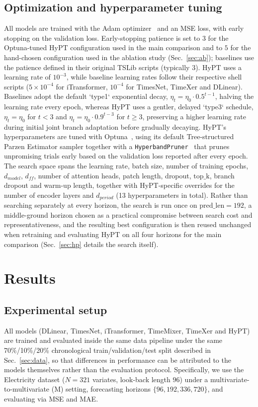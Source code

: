 \documentclass[10pt,journal]{IEEEtran}
\newcommand{\secref}[1]{Sec.~\ref{#1}}
\begin{document}
\subsection{Optimization and hyperparameter tuning}
All models are trained with the Adam optimizer~\cite{adam} and an MSE loss, with early stopping on the validation loss. Early-stopping patience is set to $3$ for the Optuna-tuned HyPT configuration used in the main comparison and to $5$ for the hand-chosen configuration used in the ablation study (\secref{sec:ab}); baselines use the patience defined in their original TSLib scripts (typically $3$). HyPT uses a learning rate of $10^{-3}$, while baseline learning rates follow their respective shell scripts ($5\times10^{-4}$ for iTransformer, $10^{-4}$ for TimesNet, TimeXer and DLinear). Baselines adopt the default `type1` exponential decay, $\eta_t = \eta_0 \cdot 0.5^{t-1}$, halving the learning rate every epoch, whereas HyPT uses a gentler, delayed `type3` schedule, $\eta_t = \eta_0$ for $t<3$ and $\eta_t = \eta_0 \cdot 0.9^{t-3}$ for $t\ge3$, preserving a higher learning rate during initial joint branch adaptation before gradually decaying. HyPT's hyperparameters are tuned with Optuna~\cite{optuna}, using its default Tree-structured Parzen Estimator sampler together with a \texttt{HyperbandPruner}~\cite{shp} that prunes unpromising trials early based on the validation loss reported after every epoch. The search space spans the learning rate, batch size, number of training epochs, $d_{model}$, $d_{ff}$, number of attention heads, patch length, dropout, $\mathrm{top\_k}$, branch dropout and warm-up length, together with HyPT-specific overrides for the number of encoder layers and $d_{period}$ (13 hyperparameters in total). Rather than searching separately at every horizon, the search is run once on $\mathrm{pred\_len}=192$, a middle-ground horizon chosen as a practical compromise between search cost and representativeness, and the resulting best configuration is then reused unchanged when retraining and evaluating HyPT on all four horizons for the main comparison (\secref{sec:hp} details the search itself).


\section{Results}
\label{sec:results}

\subsection{Experimental setup}
All models (DLinear, TimesNet, iTransformer, TimeMixer, TimeXer and HyPT) are trained and evaluated inside the same data pipeline under the same 70\%/10\%/20\% chronological train/validation/test split described in \secref{sec:data}, so that differences in performance can be attributed to the models themselves rather than the evaluation protocol. Specifically, we use the Electricity dataset ($N=321$ variates, look-back length $96$) under a multivariate-to-multivariate (M) setting, forecasting horizons $\{96, 192, 336, 720\}$, and evaluating via MSE and MAE.
\end{document}
